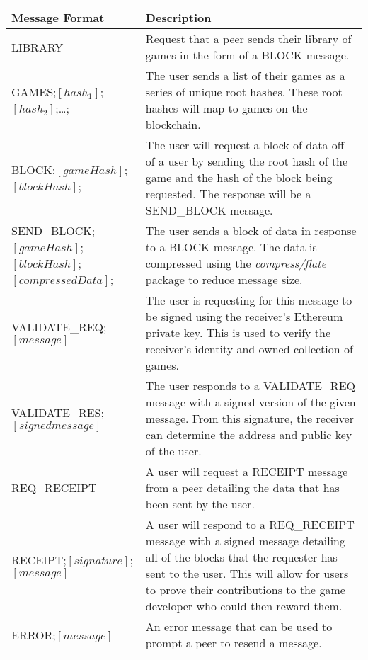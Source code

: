 \begin{longtable}{p{} p{}}
  \toprule
  \textbf{Message Format} & \textbf{Description}\\
  \midrule\midrule
  LIBRARY
  & Request that a peer sends their library of games in the form of a BLOCK message.\\
  GAMES;$[hash_1]$;$[hash_2]$;\ldots;
  & The user sends a list of their games as a series of unique root hashes. These root hashes will map to games on the blockchain.\\
  \midrule
  BLOCK;$[gameHash]$;$[blockHash]$;
  & The user will request a block of data off of a user by sending the root hash of the game and the hash of the block being requested. The response will be a SEND\_BLOCK message.\\
  SEND\_BLOCK;$[gameHash]$;\newline $[blockHash]$;$[compressedData]$;
  & The user sends a block of data in response to a BLOCK message. The data is compressed using the \textit{compress/flate} package to reduce message size.\\
  \midrule
  VALIDATE\_REQ;$[message]$
  & The user is requesting for this message to be signed using the receiver's Ethereum private key. This is used to verify the receiver's identity and owned collection of games.\\
  VALIDATE\_RES;$[signed message]$
  & The user responds to a VALIDATE\_REQ message with a signed version of the given message. From this signature, the receiver can determine the address and public key of the user.\\
  \midrule
  REQ\_RECEIPT
  & A user will request a RECEIPT message from a peer detailing the data that has been sent by the user.\\
  RECEIPT;$[signature]$;$[message]$
  & A user will respond to a REQ\_RECEIPT message with a signed message detailing all of the blocks that the requester has sent to the user. This will allow for users to prove their contributions to the game developer who could then reward them.\\
  \midrule
  ERROR;$[message]$
  & An error message that can be used to prompt a peer to resend a message.\\
  \bottomrule\bottomrule
\end{longtable}